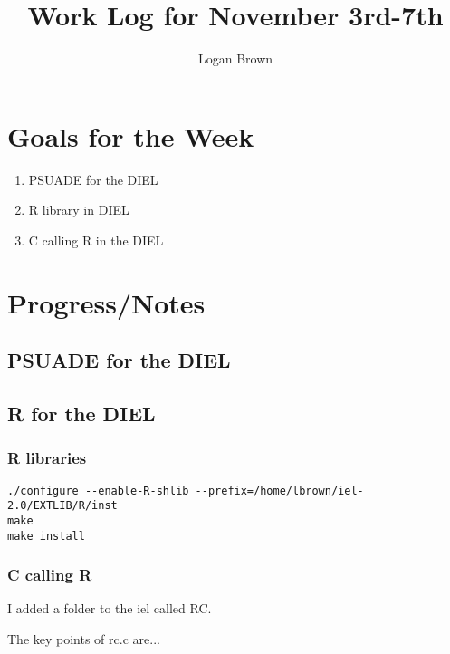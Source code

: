 

\title{Work Log for November 3rd-7th}
\author{Logan Brown}


\maketitle


\section{Goals for the Week}
\begin{enumerate}
\item PSUADE for the DIEL
\item R library in DIEL
\item C calling R in the DIEL
\end{enumerate}

\section{Progress/Notes}

\subsection{PSUADE for the DIEL}

\subsection{R for the DIEL}

\subsubsection{R libraries}

\begin{verbatim}
./configure --enable-R-shlib --prefix=/home/lbrown/iel-2.0/EXTLIB/R/inst
make
make install
\end{verbatim}



\subsubsection{C calling R}

I added a folder to the iel called RC.

The key points of rc.c are...

